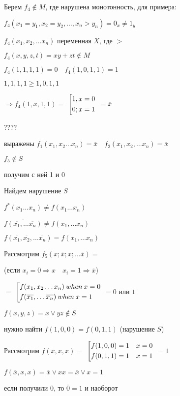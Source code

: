 \documentclass[russian]{lecture-notes}
\begin{document}
	Берем $f_4 \notin M$, где нарушена монотонность, для примера:
	
	$f_4(x_1 = y_1, x_2 = y_2, \dots, x_n > y_n) = 0_x \neq 1_y$
	
	$f_4(x_1, x_2, \dots x_n)$ переменная $X$, где $>$ 
	
	$f_4(x, y, z, t) = xy + zt \notin M$
	
	$f_4(1, 1, 1, 1) = 0 \quad f_4(1, 0, 1, 1) = 1$
	
	$1, 1, 1, 1 \geq 1, 0, 1, 1$
	
	$\Rightarrow f_4(1, x, 1, 1) = $
	$\left[ 
  		\begin{gathered} 
    			1, x = 0 \hfill 
        \\ 
        		0; x = 1 \hfill 
        \\ 
	  	\end{gathered} 
	\right.$
	$ = \overline{x}$
	
	????

	выражены $f_1(x_1, x_2 \dots x_n) = \overline{x} \quad f_2(x_1, x_2, \dots x_n) = \overline{x}$
	
	$f_5 \notin S$
	
	получим с ней 1 и 0
	
	Найдем нарушение $S$
	
	$f^*(x_1 \dots x_n) \neq f(x_1 \dots x_n)$
	
	$\overline{f(\overline{x_1}, \dots \overline{x_n})} \neq f(x_1, \dots x_n)$
	
	$f(\overline{x_1}, \overline{x_2}, \dots \overline{x_n}) = f(x_1, \dots x_n)$
	
	Рассмотрим $f_5(x; \overline{x}; x; \dots \overline{x}) = $ 
	
	(если $x_i = 0 \Rightarrow x \quad x_i = 1 \Rightarrow \overline{x}$)
	
	$= $
	$\left[ 
  		\begin{gathered} 
    			f(x_1, x_2 \dots x_n) \: when \: x = 0 \hfill 
        \\ 
        		f(\overline{x_1}, \dots \overline{x_n}) \: when \: x = 1 \hfill 
        \\ 
	  	\end{gathered} 
	\right.$
	$ = 0$ или $1$
	
\begin{example}
	$f(x, y, z) = x \lor yz \notin S$
	
	нужно найти $f(1, 0, 0) = f(0, 1, 1)$ (нарушение $S$)
	
	Рассмотрим $f(\overline{x}, x, x) = $
	$\left[ 
  		\begin{gathered} 
    			f(1, 0, 0) = 1 \quad x = 0 \hfill 
        \\ 
        		f(0, 1, 1) = 1 \quad x = 1 \hfill 
        \\ 
	  	\end{gathered} 
	\right.$
	$ = 1$
	
	$f(\overline{x}, x, x) = \overline{x} \lor xx = \overline{x} \lor x = 1$
	
	если получили 0, то $\overline{0} = 1$ и наоборот
\end{example}
\end{document}
